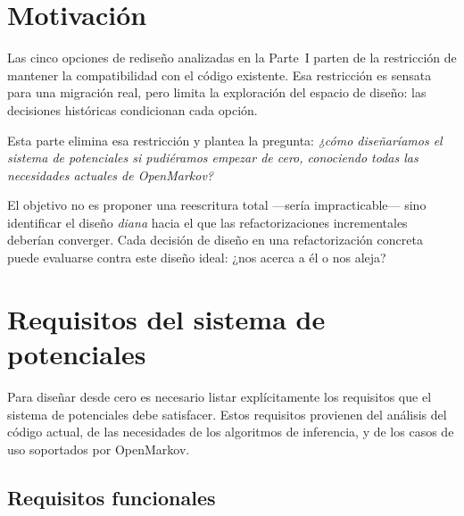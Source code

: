 \documentclass[11pt,a4paper]{article}
\begin{document}
\section{Motivación}
\label{sec:ideal-motivacion}

Las cinco opciones de rediseño analizadas en la Parte~I parten de la
restricción de mantener la compatibilidad con el código existente.  Esa
restricción es sensata para una migración real, pero limita la exploración
del espacio de diseño: las decisiones históricas condicionan cada opción.

Esta parte elimina esa restricción y plantea la pregunta:
\emph{¿cómo diseñaríamos el sistema de potenciales si pudiéramos empezar
de cero, conociendo todas las necesidades actuales de OpenMarkov?}

El objetivo no es proponer una reescritura total ---sería impracticable---
sino identificar el diseño \emph{diana} hacia el que las refactorizaciones
incrementales deberían converger.  Cada decisión de diseño en una
refactorización concreta puede evaluarse contra este diseño ideal:
¿nos acerca a él o nos aleja?

\section{Requisitos del sistema de potenciales}
\label{sec:ideal-requisitos}

Para diseñar desde cero es necesario listar explícitamente los requisitos
que el sistema de potenciales debe satisfacer.  Estos requisitos provienen
del análisis del código actual, de las necesidades de los algoritmos de
inferencia, y de los casos de uso soportados por OpenMarkov.

\subsection{Requisitos funcionales}
\end{document}
